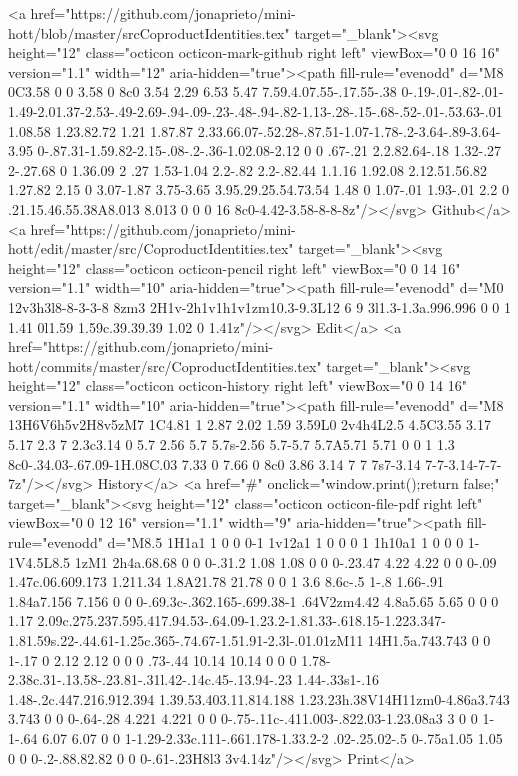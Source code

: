       <a href="https://github.com/jonaprieto/mini-hott/blob/master/srcCoproductIdentities.tex" target="_blank"><svg height="12" class="octicon octicon-mark-github right left" viewBox="0 0 16 16" version="1.1" width="12" aria-hidden="true"><path fill-rule="evenodd" d="M8 0C3.58 0 0 3.58 0 8c0 3.54 2.29 6.53 5.47 7.59.4.07.55-.17.55-.38 0-.19-.01-.82-.01-1.49-2.01.37-2.53-.49-2.69-.94-.09-.23-.48-.94-.82-1.13-.28-.15-.68-.52-.01-.53.63-.01 1.08.58 1.23.82.72 1.21 1.87.87 2.33.66.07-.52.28-.87.51-1.07-1.78-.2-3.64-.89-3.64-3.95 0-.87.31-1.59.82-2.15-.08-.2-.36-1.02.08-2.12 0 0 .67-.21 2.2.82.64-.18 1.32-.27 2-.27.68 0 1.36.09 2 .27 1.53-1.04 2.2-.82 2.2-.82.44 1.1.16 1.92.08 2.12.51.56.82 1.27.82 2.15 0 3.07-1.87 3.75-3.65 3.95.29.25.54.73.54 1.48 0 1.07-.01 1.93-.01 2.2 0 .21.15.46.55.38A8.013 8.013 0 0 0 16 8c0-4.42-3.58-8-8-8z"/></svg> Github</a>
      <a href="https://github.com/jonaprieto/mini-hott/edit/master/src/CoproductIdentities.tex" target="_blank"><svg height="12" class="octicon octicon-pencil right left" viewBox="0 0 14 16" version="1.1" width="10" aria-hidden="true"><path fill-rule="evenodd" d="M0 12v3h3l8-8-3-3-8 8zm3 2H1v-2h1v1h1v1zm10.3-9.3L12 6 9 3l1.3-1.3a.996.996 0 0 1 1.41 0l1.59 1.59c.39.39.39 1.02 0 1.41z"/></svg> Edit</a>
      <a href="https://github.com/jonaprieto/mini-hott/commits/master/src/CoproductIdentities.tex" target="_blank"><svg height="12" class="octicon octicon-history right left" viewBox="0 0 14 16" version="1.1" width="10" aria-hidden="true"><path fill-rule="evenodd" d="M8 13H6V6h5v2H8v5zM7 1C4.81 1 2.87 2.02 1.59 3.59L0 2v4h4L2.5 4.5C3.55 3.17 5.17 2.3 7 2.3c3.14 0 5.7 2.56 5.7 5.7s-2.56 5.7-5.7 5.7A5.71 5.71 0 0 1 1.3 8c0-.34.03-.67.09-1H.08C.03 7.33 0 7.66 0 8c0 3.86 3.14 7 7 7s7-3.14 7-7-3.14-7-7-7z"/></svg> History</a>
      <a  href="#" onclick="window.print();return false;" target="_blank"><svg height="12" class="octicon octicon-file-pdf right left" viewBox="0 0 12 16" version="1.1" width="9" aria-hidden="true"><path fill-rule="evenodd" d="M8.5 1H1a1 1 0 0 0-1 1v12a1 1 0 0 0 1 1h10a1 1 0 0 0 1-1V4.5L8.5 1zM1 2h4a.68.68 0 0 0-.31.2 1.08 1.08 0 0 0-.23.47 4.22 4.22 0 0 0-.09 1.47c.06.609.173 1.211.34 1.8A21.78 21.78 0 0 1 3.6 8.6c-.5 1-.8 1.66-.91 1.84a7.156 7.156 0 0 0-.69.3c-.362.165-.699.38-1 .64V2zm4.42 4.8a5.65 5.65 0 0 0 1.17 2.09c.275.237.595.417.94.53-.64.09-1.23.2-1.81.33-.618.15-1.223.347-1.81.59s.22-.44.61-1.25c.365-.74.67-1.51.91-2.3l-.01.01zM11 14H1.5a.743.743 0 0 1-.17 0 2.12 2.12 0 0 0 .73-.44 10.14 10.14 0 0 0 1.78-2.38c.31-.13.58-.23.81-.31l.42-.14c.45-.13.94-.23 1.44-.33s1-.16 1.48-.2c.447.216.912.394 1.39.53.403.11.814.188 1.23.23h.38V14H11zm0-4.86a3.743 3.743 0 0 0-.64-.28 4.221 4.221 0 0 0-.75-.11c-.411.003-.822.03-1.23.08a3 3 0 0 1-1-.64 6.07 6.07 0 0 1-1.29-2.33c.111-.661.178-1.33.2-2 .02-.25.02-.5 0-.75a1.05 1.05 0 0 0-.2-.88.82.82 0 0 0-.61-.23H8l3 3v4.14z"/></svg> Print</a>

